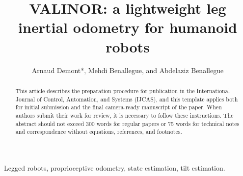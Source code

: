 \documentclass{IJCAS}
\begin{document}
\newcommand{\getErrorResult}[5]{\csname#1#2#3#4#5\endcsname}



\title{VALINOR: a lightweight leg inertial odometry for humanoid robots}

\author{Arnaud Demont*, Mehdi Benallegue, and Abdelaziz Benallegue\orcid{}}

\begin{abstract}
This article describes the preparation procedure for publication in the International Journal of Control, Automation, and Systems (IJCAS), and this template applies both for initial submission and the final camera-ready manuscript of the paper. When authors submit their work for review, it is necessary to follow these instructions. The abstract should not exceed 300 words for regular papers or 75 words for technical notes and correspondence without equations, references, and footnotes.
\end{abstract}

\begin{keywords}
  Legged robots, proprioceptive odometry, state estimation, tilt estimation.
\end{keywords}

\maketitle

\end{document}
